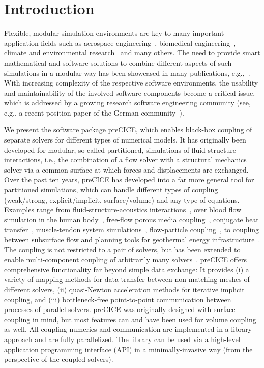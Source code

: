\section{Introduction} 

Flexible, modular simulation environments are key to many important application fields such as aerospace engineering~\cite{Slotnick2014}, biomedical engineering~\cite{HellersteibBiomed2019}, climate and environmental research~\cite{Climate2020} and many others.
The need to provide smart mathematical and software solutions to combine different aspects of such
simulations in a modular way has been showcased in many publications, e.g.,~\cite{Keyes2013}. With increasing complexity of the respective software environments, the usability and maintainability of the involved software components become a critical issue, which is addressed by a growing research software engineering community (see, e.g., a recent position paper of the German community~\cite{Anzt2021_RSE}).

We present the software package preCICE, which enables black-box coupling of separate solvers for different types of numerical models. It has originally been developed for modular, so-called partitioned, simulations of fluid-structure interactions, i.e., the combination of a flow solver with a structural mechanics solver via a common surface at which forces and displacements are exchanged. Over the past ten years, preCICE has developed into a far more general tool for partitioned simulations, which can handle different types of coupling (weak/strong, explicit/implicit, surface/volume) and any type of equations. Examples range from fluid-structure-acoustics interactions~\cite{Lindner2020_ExaFSA}, over blood flow simulation in the human body~\cite{naseri2020scalable}, free-flow porous media coupling~\cite{Jaust2020}, conjugate heat transfer~\cite{fan2020study}, muscle-tendon system simulations~\cite{Maier2021_Diss}, flow-particle coupling~\cite{besseron2021eulerian}, to coupling between subsurface flow and planning tools for geothermal energy infrastructure~\cite{geoKW}. The coupling is not restricted to a pair of solvers, but has been extended to enable multi-component coupling of arbitrarily many solvers~\cite{Bungartz2014_MIQN_CompuMech}.
%
preCICE offers comprehensive functionality far beyond simple data exchange: It provides (i) a variety of mapping methods for data transfer between non-matching meshes of different solvers, (ii) quasi-Newton acceleration methods for iterative implicit coupling, and (iii) bottleneck-free point-to-point communication between processes of parallel solvers. preCICE was originally designed with surface coupling in mind, but most features can and have been used for volume coupling as well. All coupling numerics and communication are implemented in a library approach and are fully parallelized. The library can be used via a high-level application programming interface (API) in a minimally-invasive way (from the perspective of the coupled solvers).

